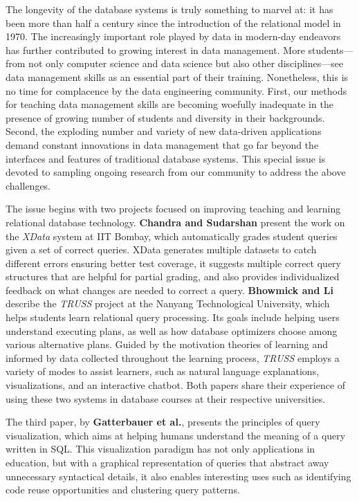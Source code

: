 \documentclass[11pt]{article}
\begin{document}
The longevity of the database systems is truly something to marvel at:
it has been more than half a century since the introduction of the relational model in 1970.
The increasingly important role played by data in modern-day endeavors has further contributed to growing interest in data management.
More students---from not only computer science and data science but also other disciplines---see data management skills as an essential part of their training.
Nonetheless, this is no time for complacence by the data engineering community.
First, our methods for teaching data management skills are becoming woefully inadequate in the presence of growing number of students and diversity in their backgrounds.
Second, the exploding number and variety of new data-driven applications demand constant innovations in data management that go far beyond the interfaces and features of traditional database systems.
This special issue is devoted to sampling ongoing research from our community to address the above challenges.

The issue begins with two projects focused on improving teaching and learning relational database technology. \textbf{Chandra and Sudarshan} present the work on the \emph{XData} system at IIT Bombay, which automatically grades student queries given a set of correct queries. XData generates multiple datasets to catch different errors ensuring better test coverage, it suggests multiple correct query structures that are helpful for partial grading, and also provides individualized feedback on what changes are needed to correct a query.
\textbf{Bhowmick and Li} describe the \emph{TRUSS} project at the Nanyang Technological University, which helps students learn relational query processing. Its goals include helping users understand executing plans, as well as how database optimizers choose among various alternative plans. Guided by the motivation theories of learning and informed by data collected throughout the learning process, \emph{TRUSS} employs a variety of modes to assist learners, such as natural language explanations, visualizations, and an interactive chatbot. Both papers share their experience of using these two systems in database courses at their respective universities. 

The third paper, by \textbf{Gatterbauer et al.}, presents the principles of query visualization, which aims at helping humans understand the meaning of a query written in SQL. This visualization paradigm has not only applications in education, but with a graphical representation of queries that abstract away unnecessary syntactical details, it also enables interesting uses such as identifying code reuse opportunities and clustering query patterns.
\end{document}
